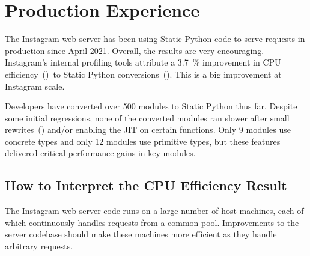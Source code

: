 \documentclass[english,cleveref,crc]{programming}
\newcommand{\SP}{Static Python}
\newcommand{\CPUchange}{\SI{3.7}{\percent}}
\begin{document}
\section{Production Experience}
\label{s:eval}




The Instagram web server has been using \SP{} code to serve requests in
production since April 2021.
Overall, the results are very encouraging.
Instagram's internal profiling tools attribute a \CPUchange{} improvement
in CPU efficiency~()~to \SP{} conversions~().
This is a big improvement at Instagram scale.

Developers have converted over 500 modules to \SP{} thus far.
Despite some initial regressions, none of the converted modules
ran slower after small rewrites~()
and/or enabling the JIT on certain functions.
Only 9 modules use concrete types and only 12 modules use primitive types,
but these features delivered critical performance gains in key modules.



\subsection{How to Interpret the CPU Efficiency Result}
\label{s:what-is-cpu}

The Instagram web server code runs on a large number of host machines, each of
which continuously handles requests from a common pool.
Improvements to the server codebase should make these machines more efficient
as they handle arbitrary requests.
\end{document}
